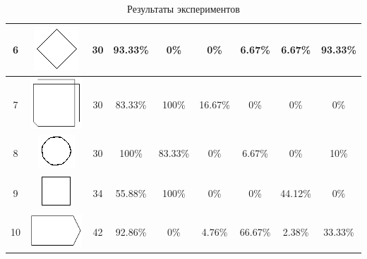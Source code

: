 \documentclass[a5paper]{article}
\begin{document}
\begin{table}[ht]
\begin{tabular} {| c | c | c | c | c | c | c | c | c |}
    6&   \includegraphics[scale=0.5]{gesture6.png}    & 30                 & 93.33\% & 0\%            & 0\% & 6.67\%              & 6.67\%  & 93.33\% \\ \hline
    7&   \includegraphics[scale=0.35]{gesture7.png}    & 30                 & 83.33\% & 100\%          & 16.67\% & 0\%              & 0\%  & 0\% \\ \hline
    8&   \includegraphics[scale=0.5]{gesture8.png}    & 30                 & 100\%   & 83.33\%        & 0\% & 6.67\%              & 0\%  & 10\% \\ \hline
    9&   \includegraphics[scale=0.5]{gesture9.png}    & 34                 & 55.88\% & 100\%          & 0\% & 0\%              & 44.12\%  & 0\% \\ \hline
    10&  \includegraphics[scale=0.5]{gesture10.png}   & 42                 & 92.86\% & 0\%            & 4.76\% & 66.67\%              & 2.38\%  & 33.33\% \\ \hline
  \end{tabular}
  \caption{Результаты экспериментов}
\end{table}

\fontsize{10}{12}
\selectfont
\end{document}
